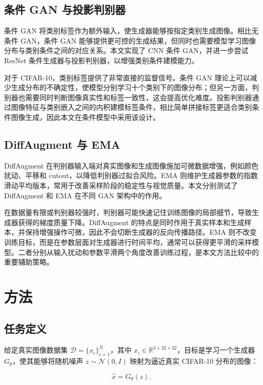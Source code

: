 \documentclass[UTF8,a4paper,12pt]{ctexart}
\begin{document}
\subsection{条件 GAN 与投影判别器}

条件 GAN 将类别标签作为额外输入，使生成器能够按指定类别生成图像。相比无条件 GAN，条件 GAN 能够提供更可控的生成结果，但同时也需要模型学习图像分布与类别条件之间的对应关系。本文实现了 CNN 条件 GAN，并进一步尝试 ResNet 条件生成器与投影判别器，以增强类别条件建模能力。


对于 CIFAR-10，类别标签提供了非常直接的监督信号。条件 GAN 理论上可以减少生成分布的不确定性，使模型分别学习十个类别下的图像分布；但另一方面，判别器也需要同时判断图像真实性和标签一致性，这会提高优化难度。投影判别器通过图像特征与类别嵌入之间的内积建模标签条件，相比简单拼接标签更适合类别条件图像生成，因此本文在条件模型中采用该设计。


\subsection{DiffAugment 与 EMA}

DiffAugment 在判别器输入端对真实图像和生成图像施加可微数据增强，例如颜色扰动、平移和 cutout，以降低判别器过拟合风险。EMA 则维护生成器参数的指数滑动平均版本，常用于改善采样阶段的稳定性与视觉质量。本文分别测试了 DiffAugment 和 EMA 在不同 GAN 架构中的作用。


在数据量有限或判别器较强时，判别器可能快速记住训练图像的局部细节，导致生成器获得的梯度质量下降。DiffAugment 的特点是同时作用于真实样本和生成样本，并保持增强操作可微，因此不会切断生成器的反向传播路径。EMA 则不改变训练目标，而是在参数层面对生成器进行时间平均，通常可以获得更平滑的采样模型。二者分别从输入扰动和参数平滑两个角度改善训练过程，是本文方法比较中的重要辅助策略。


\section{方法}

\subsection{任务定义}

给定真实图像数据集 $\mathcal{D} = \{x_i\}_{i=1}^{N}$，其中 $x_i \in \mathbb{R}^{3 \times 32 \times 32}$，目标是学习一个生成器 $G_\theta$，使其能够将随机噪声 $z \sim \mathcal{N}(0, I)$ 映射为逼近真实 CIFAR-10 分布的图像：


$$
\hat{x} = G_\theta(z).
$$
\end{document}
